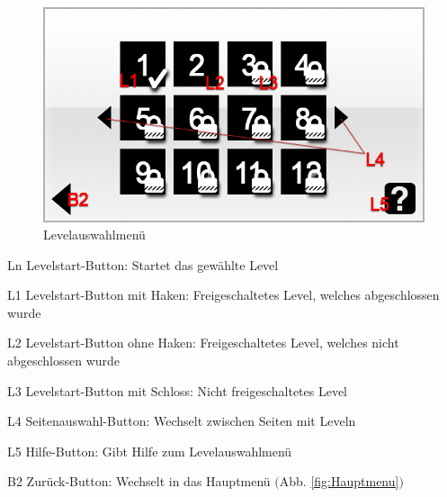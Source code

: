 \begin{figure}[H]
\centering
\includegraphics[scale=0.55]{../gui/_jpeg_numeration/level.jpg}
\caption{Levelauswahlmenü}
\label{fig:Levelauswahlmenu}
\end{figure}
\begin{description*}
\item[Ln] Levelstart-Button: Startet das gewählte Level
\item[L1] Levelstart-Button mit Haken: Freigeschaltetes Level, welches abgeschlossen wurde
\item[L2] Levelstart-Button ohne Haken: Freigeschaltetes Level, welches nicht abgeschlossen wurde
\item[L3] Levelstart-Button mit Schloss: Nicht freigeschaltetes Level
\item[L4] Seitenauswahl-Button: Wechselt zwischen Seiten mit Leveln
\item[L5] Hilfe-Button: Gibt Hilfe zum Levelauswahlmenü
\item[B2] Zurück-Button: Wechselt in das Hauptmenü $($Abb. \ref{fig:Hauptmenu}$)$
\end{description*}


